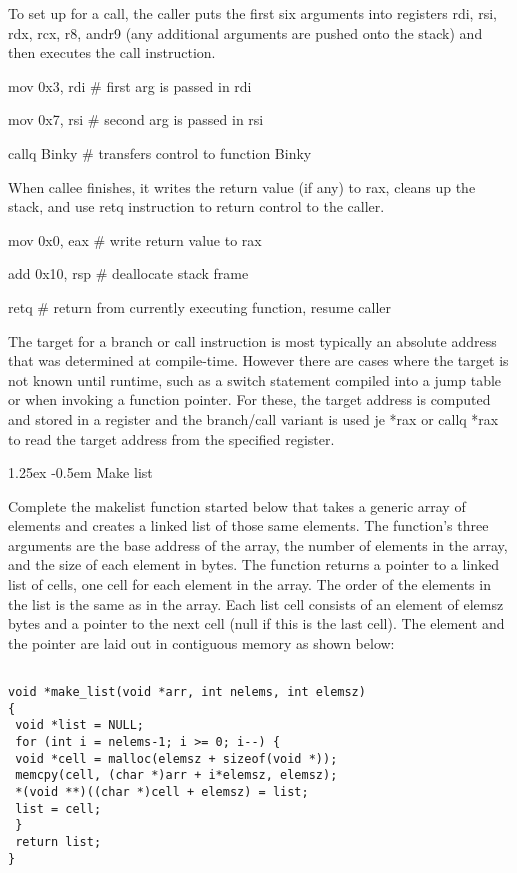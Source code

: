 \documentclass[10pt]{article}
\makeatletter
\newlength{\norm}
\newlength{\nrm}
\renewcommand{\paragraph}{%
  \@startsection{paragraph}{4}%
  {\z@}{1.25ex \@plus 2pt \@minus 2pt}{-0.5em}%
  {\fontsize{\f@size}{\nrm}\normalfont\bfseries}%
}
\makeatother
\begin{document}
{\begin{multicols*}{5}
To set up for a call, the caller puts the first six arguments into registers rdi, rsi, rdx, rcx, r8, andr9 (any additional arguments are pushed onto the stack) and then executes the call instruction.

mov 0x3, rdi    # first arg is passed in rdi

mov 0x7, rsi    # second arg is passed in rsi

callq Binky       # transfers control to function Binky

When callee finishes, it writes the return value (if any) to rax, cleans up the stack, and use retq instruction to return control to the caller.

mov 0x0, eax    # write return value to rax

add 0x10, rsp   # deallocate stack frame

retq              # return from currently executing function, resume caller

The target for a branch or call instruction is most typically an absolute address that was determined at compile-time. However there are cases where the target is not known until runtime, such as a switch statement compiled into a jump table or when invoking a function pointer. For these, the target address is computed and stored in a register and the branch/call variant is used je *rax or callq *rax to read the target address from the specified register.


\paragraph{Make list}

Complete the makelist function started below that takes a generic array of elements and creates
a linked list of those same elements. The function's three arguments are the base address of the
array, the number of elements in the array, and the size of each element in bytes.
The function returns a pointer to a linked list of cells, one cell for each element in the array. The
order of the elements in the list is the same as in the array. Each list cell consists of an element of
elemsz bytes and a pointer to the next cell (null if this is the last cell). The element and the pointer
are laid out in contiguous memory as shown below:

\begin{lstlisting}[breaklines=true,columns=fullflexible]

void *make_list(void *arr, int nelems, int elemsz)
{
 void *list = NULL;
 for (int i = nelems-1; i >= 0; i--) {
 void *cell = malloc(elemsz + sizeof(void *));
 memcpy(cell, (char *)arr + i*elemsz, elemsz);
 *(void **)((char *)cell + elemsz) = list;
 list = cell;
 }
 return list;
}
\end{lstlisting}


\end{multicols*}}
\end{document}
